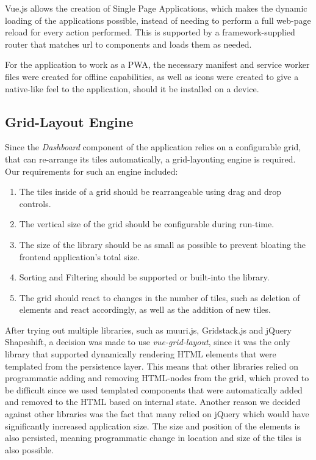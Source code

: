  Vue.js allows the creation of Single Page Applications, which makes the dynamic loading of the applications possible, instead of needing to perform a full web-page reload for every action performed. This is supported by a framework-supplied router that matches url to components and loads them as needed.
 
 For the application to work as a PWA, the necessary manifest and service worker files were created for offline capabilities, as well as icons were created to give a native-like feel to the application, should it be installed on a device.
 
 \subsection{Grid-Layout Engine}
 Since the \emph{Dashboard} component of the application relies on a configurable grid, that can re-arrange its tiles automatically, a grid-layouting engine is required. Our requirements for such an engine included:
 \begin{enumerate}
    \item The tiles inside of a grid should be rearrangeable using drag and drop controls.
    \item The vertical size of the grid should be configurable during run-time.
    \item The size of the library should be as small as possible to prevent bloating the frontend application's total size.
    \item Sorting and Filtering should be supported or built-into the library.
    \item The grid should react to changes in the number of tiles, such as deletion of elements and react accordingly, as well as the addition of new tiles.
\end{enumerate}{}
After trying out multiple libraries, such as muuri.js, Gridstack.js and jQuery Shapeshift, a decision was made to use \emph{vue-grid-layout}, since it was the only library that supported dynamically rendering HTML elements that were templated from the persistence layer. This means that other libraries relied on programmatic adding and removing HTML-nodes from the grid, which proved to be difficult since we used templated components that were automatically added and removed to the HTML based on internal state. Another reason we decided against other libraries was the fact that many relied on jQuery which would have significantly increased application size.
The size and position of the elements is also persisted, meaning programmatic change in location and size of the tiles is also possible.
